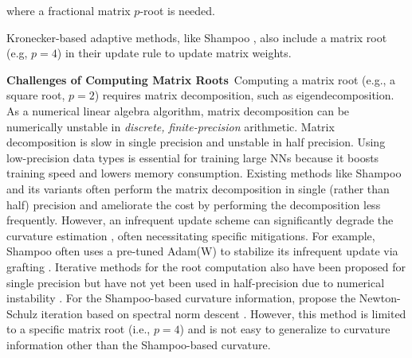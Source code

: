 \vspace{-0.4cm}
where a fractional matrix $p$-root is needed.


%
Kronecker-based adaptive methods, like Shampoo \citep{gupta18shampoo}, 
also include a matrix root (e.g, $p=4$) in their update rule to update matrix weights.
%
%
%
%
%
%


{\bf Challenges of Computing Matrix Roots}\,
Computing a matrix root (e.g., a square root, $p=2$) requires matrix decomposition, such as eigendecomposition. As a numerical linear algebra algorithm, matrix decomposition can be numerically unstable in \emph{discrete, finite-precision} arithmetic. Matrix decomposition is slow in single precision and unstable in half precision.
Using low-precision data types \citep{micikevicius2017mixed} is essential for training large NNs because it boosts training speed and lowers memory consumption.
Existing methods like Shampoo \citep{gupta18shampoo,shi2023distributed} and its variants \citep{vyas2024soap} often perform the matrix decomposition in single (rather than half) precision and ameliorate the cost by performing the decomposition less frequently. However, an infrequent update scheme can significantly degrade the curvature estimation  \citep{vyas2024soap}, often necessitating specific mitigations. For example, Shampoo often uses a pre-tuned Adam(W) to stabilize its infrequent update \citep{shi2023distributed,vyas2024soap} via grafting \citep{agarwallearning}. 
Iterative methods for the root computation \citep{anil2020scalable} also have been proposed
for single precision but have not yet been used in half-precision due to numerical instability \citep{shi2023distributed}.
For the Shampoo-based curvature information, 
\citet{muon2024} propose the Newton-Schulz iteration based 
on spectral norm descent \citep{bernstein2024old}.
However, this method is limited to a specific matrix root (i.e., $p=4$) and is not easy to generalize to curvature information other than the Shampoo-based curvature.


\vspace{-0.25cm}
